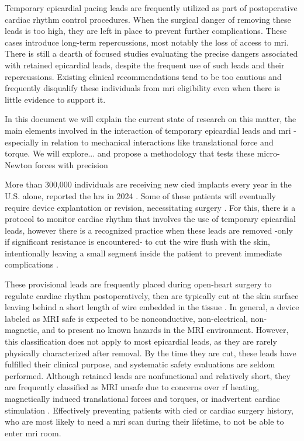 Temporary epicardial pacing leads are frequently utilized as part of postoperative cardiac rhythm control procedures. When the surgical danger of removing these leads is too high, they are left in place to prevent further complications. These cases introduce long-term repercussions, most notably the loss of access to \gls{mri}. There is still a dearth of focused studies evaluating the precise dangers associated with retained epicardial leads, despite the frequent use of such leads and their repercussions. Existing clinical recommendations tend to be too cautious and frequently disqualify these individuals from \gls{mri} eligibility even when there is little evidence to support it.


In this document we will explain the current state of research on this matter, the main elements involved in the interaction of temporary epicardial leads and \gls{mri} - especially in relation to mechanical interactions like translational force and torque. We will explore... and propose a methodology that tests these micro-Newton forces with precision 



More than 300,000 individuals are receiving new \gls{cied} implants every year in the U.S. alone, reported the \gls{hrs} in 2024 \cite{HRS2024_CIEDs}. Some of these patients will eventually require device explantation or revision, necessitating surgery \cite{Mubarak:2023aa}. For this, there is a protocol to monitor cardiac rhythm that involves the use of temporary epicardial leads, however there is a recognized practice when these leads are removed -only if significant resistance is encountered- to cut the wire flush with the skin, intentionally leaving a small segment inside the patient to prevent immediate complications \cite{aboyewa2021, doi:10.2214/ajr.168.5.9129404,PSA_Advisory_2006}.

These provisional leads are frequently placed during open-heart surgery to regulate cardiac rhythm postoperatively, then are typically cut at the skin surface leaving behind a short length of wire embedded in the tissue \cite{reade2007}. In general, a device labeled as MRI safe is expected to be nonconductive, non-electrical, non-magnetic, and to present no known hazards in the MRI environment. However, this classification does not apply to most epicardial leads, as they are rarely physically characterized after removal. By the time they are cut, these leads have fulfilled their clinical purpose, and systematic safety evaluations are seldom performed. Although retained leads are nonfunctional and relatively short, they are frequently classified as MRI unsafe due to concerns over \gls{rf} heating, magnetically induced translational forces and torques, or inadvertent cardiac stimulation \cite{poh2017,muthalaly2018,ACC_2024_MRI_CIEDs}. Effectively preventing patients with \gls{cied} or cardiac surgery history, who are most likely to need a \gls{mri} scan during their lifetime, to not be able to enter \gls{mri} room. 

